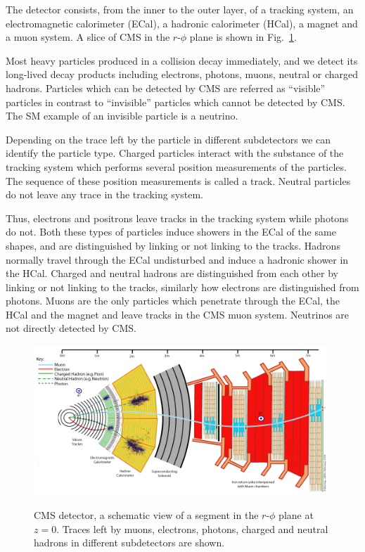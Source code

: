 The detector consists, from the inner to the outer layer,  of a tracking system, an electromagnetic calorimeter (ECal), a hadronic calorimeter (HCal), a magnet and a muon system. A slice of CMS in the $r$-$\phi$ plane is shown in Fig.~\ref{fig:CMS_slice}.

Most heavy particles produced in a collision decay immediately, and we detect its long-lived decay products including electrons, photons, muons, neutral or charged hadrons. Particles which can be detected by CMS are referred as ``visible'' particles in contrast to ``invisible'' particles which cannot be detected by CMS. The SM example of an invisible particle is a neutrino.

Depending on the trace left by the particle in different subdetectors we can identify the particle type. Charged particles interact with the substance of the tracking system which performs several position measurements of the particles. The sequence of these position measurements is called a track. Neutral particles do not leave any trace in the tracking system. 

Thus, electrons and positrons leave tracks in the tracking system while photons do not. Both these types of particles induce showers in the ECal of the same shapes, and are distinguished by linking or not linking to the tracks. Hadrons normally travel through the ECal undisturbed and induce a hadronic shower in the HCal. Charged and neutral hadrons are distinguished from each other by linking or not linking to the tracks, similarly how electrons are distinguished from photons. Muons are the only particles which penetrate through the ECal, the HCal and the magnet and leave tracks in the CMS muon system. Neutrinos are not directly detected by CMS.   

\begin{figure}[htb]
  \begin{center}
    {\includegraphics[width=0.98\textwidth]{../figs/Exp/CMS_Slice.png}}
    \caption{CMS detector, a schematic view of a segment in the $r$-$\phi$ plane at $z=0$. Traces left by muons, electrons, photons, charged and neutral hadrons in different subdetectors are shown.}
    \label{fig:CMS_slice}
  \end{center}
\end{figure}

